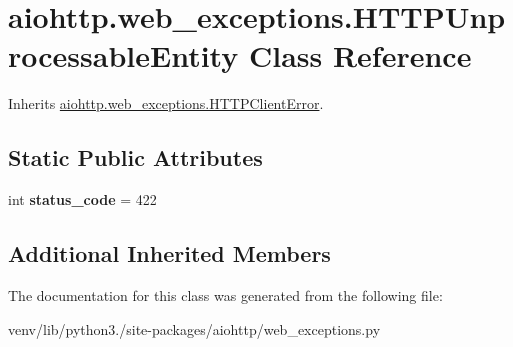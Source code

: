 \hypertarget{classaiohttp_1_1web__exceptions_1_1_h_t_t_p_unprocessable_entity}{}\section{aiohttp.\+web\+\_\+exceptions.\+H\+T\+T\+P\+Unprocessable\+Entity Class Reference}
\label{classaiohttp_1_1web__exceptions_1_1_h_t_t_p_unprocessable_entity}


Inherits \hyperlink{classaiohttp_1_1web__exceptions_1_1_h_t_t_p_client_error}{aiohttp.\+web\+\_\+exceptions.\+H\+T\+T\+P\+Client\+Error}.

\subsection*{Static Public Attributes}
\begin{DoxyCompactItemize}
\item 
\mbox{\label{classaiohttp_1_1web__exceptions_1_1_h_t_t_p_unprocessable_entity_ae335f599ac61da7eb9bea1a72daaca1c}} 
int {\bfseries status\+\_\+code} = 422
\end{DoxyCompactItemize}
\subsection*{Additional Inherited Members}


The documentation for this class was generated from the following file\+:\begin{DoxyCompactItemize}
\item 
venv/lib/python3./site-\/packages/aiohttp/web\+\_\+exceptions.\+py\end{DoxyCompactItemize}
